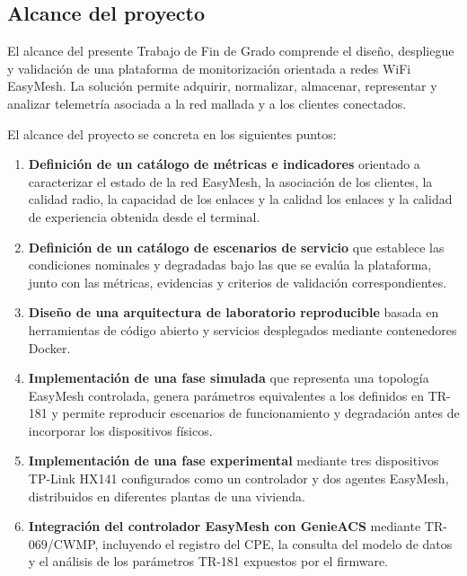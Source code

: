 \subsection{Alcance del proyecto}
\label{subsec:alcance-proyecto}

El alcance del presente Trabajo de Fin de Grado comprende el diseño,
despliegue y validación de una plataforma de monitorización orientada a
redes WiFi EasyMesh. La solución permite adquirir, normalizar, almacenar,
representar y analizar telemetría asociada a la red mallada y a los
clientes conectados.

El alcance del proyecto se concreta en los siguientes puntos:

\begin{enumerate}[
    label=\alph*),
    leftmargin=1.2cm,
    itemsep=0.5em,
    topsep=0.5em
]

    \item \textbf{Definición de un catálogo de métricas e indicadores}
    orientado a caracterizar el estado de la red EasyMesh, la asociación
    de los clientes, la calidad radio, la capacidad de los enlaces y la
    calidad los enlaces y la
    calidad de experiencia obtenida desde el terminal.

    \item \textbf{Definición de un catálogo de escenarios de servicio}
    que establece las condiciones nominales y degradadas bajo las que se
    evalúa la plataforma, junto con las métricas, evidencias y criterios
    de validación correspondientes.

    \item \textbf{Diseño de una arquitectura de laboratorio
    reproducible} basada en herramientas de código abierto y servicios
    desplegados mediante contenedores Docker.

    \item \textbf{Implementación de una fase simulada} que representa una
    topología EasyMesh controlada, genera parámetros equivalentes a los
    definidos en TR-181 y permite reproducir escenarios de funcionamiento
    y degradación antes de incorporar los dispositivos físicos.

    \item \textbf{Implementación de una fase experimental} mediante tres
    dispositivos TP-Link HX141 configurados como un controlador y dos
    agentes EasyMesh, distribuidos en diferentes plantas de una vivienda.

    \item \textbf{Integración del controlador EasyMesh con GenieACS}
    mediante TR-069/CWMP, incluyendo el registro del CPE, la consulta del
    modelo de datos y el análisis de los parámetros TR-181 expuestos por
    el firmware.


\end{enumerate}
